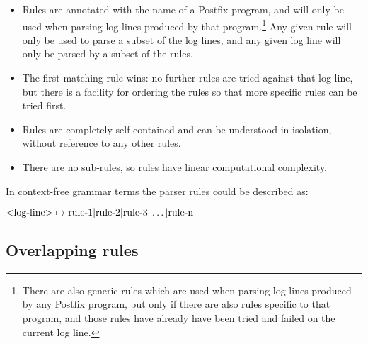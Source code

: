 \documentclass[a4paper,12pt,draft]{article}
\begin{document}
\begin{itemize}

    \item Rules are annotated with the name of a Postfix program, and will
        only be used when parsing log lines produced by that
        program.\footnote{There are also generic rules which are used when
        parsing log lines produced by any Postfix program, but only if
        there are also rules specific to that program, and those rules have
        already have been tried and failed on the current log line.}  Any
        given rule will only be used to parse a subset of the log lines,
        and any given log line will only be parsed by a subset of the
        rules.

    \item The first matching rule wins: no further rules are tried against
        that log line, but there is a facility for ordering the rules so
        that more specific rules can be tried first.

    \item Rules are completely self-contained and can be understood in
        isolation, without reference to any other rules.

    \item There are no sub-rules, so rules have linear computational
        complexity.

\end{itemize}

\label{comparison against context-free grammars}

In context-free grammar terms the parser rules could be described as:

$\text{\textless{}log-line\textgreater{}} \mapsto \text{rule-1} |
\text{rule-2} | \text{rule-3} | \dots | \text{rule-n}$


\subsection{Overlapping rules}

\label{overlapping rules}
\end{document}
